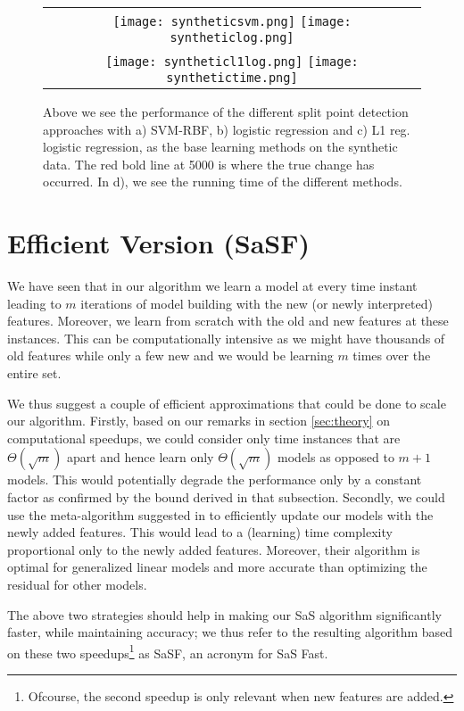 \documentclass{article}
\begin{document}
\begin{figure*}[t]
   \begin{tabular}{c}
      \texttt{[image: syntheticsvm.png]}
     \texttt{[image: syntheticlog.png]}\\
\texttt{[image: syntheticl1log.png]}
\texttt{[image: synthetictime.png]}
     \end{tabular}
    \caption{Above we see the performance of the different split point detection approaches with a) SVM-RBF, b) logistic regression and c) L1 reg. logistic regression, as the base learning methods on the synthetic data. The red bold line at 5000 is where the true change has occurred. In d), we see the running time of the different methods.}
\label{syn}
\end{figure*}

\section{Efficient Version (SaSF)}
\label{sec:eff}

We have seen that in our algorithm we learn a model at every time
instant leading to $m$ iterations of model building with the new (or
newly interpreted) features. Moreover, we learn from scratch with the
old and new features at these instances. This can be computationally
intensive as we might have thousands of old features while only a few
new and we would be learning $m$ times over the entire set.

We thus suggest a couple of efficient approximations that could be
done to scale our algorithm. Firstly, based on our remarks in section \ref{sec:theory} on computational speedups, we could
consider only time instances that are $\Theta(\sqrt{m})$ apart and hence learn
only $\Theta(\sqrt{m})$ models as opposed to $m+1$ models. This would potentially
degrade the performance only by a constant factor as confirmed by the bound derived in that subsection. Secondly, we could
use the meta-algorithm suggested in \cite{jmlr2014} to efficiently
update our models with the newly added features. This would lead to a
(learning) time complexity proportional only to the newly added
features. Moreover, their algorithm is optimal for generalized linear
models and more accurate than optimizing the residual for other
models.

The above two strategies should help in making our SaS algorithm significantly
faster, while maintaining accuracy;  we thus refer to the resulting algorithm based on these two speedups\footnote{Ofcourse, the second speedup is only relevant when new features are added.} as SaSF, an acronym for SaS Fast.
\end{document}
